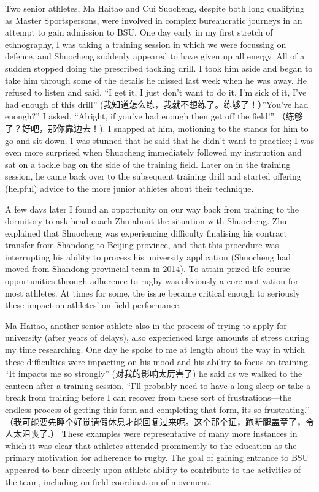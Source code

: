\begin{CJK}{UTF8}{gbsn}
Two senior athletes, Ma Haitao and Cui Suocheng, despite both long qualifying as Master Sportspersons, were involved in complex bureaucratic journeys in an attempt to gain admission to BSU.  One day early in my first stretch of ethnography, I was taking a training session in which we were focussing on defence, and Shuocheng suddenly appeared to have given up all energy.  All of a sudden stopped doing the prescribed tackling drill.  I took him aside and began to take him through some of the details he missed last week when he was away.  He refused to listen and said, ``I get it, I just don't want to do it, I'm sick of it, I've had enough of this drill'' (我知道怎么练，我就不想练了。练够了！）''You've had enough?'' I asked, ``Alright, if you've had enough then get off the field!'' （练够了？好吧，那你靠边去！).  I snapped at him, motioning to the stands for him to go and sit down. I was stunned that he said that he didn't want to practice; I was even more surprised when Shuocheng immediately followed my instruction and sat on a tackle bag on the side of the training field.  Later on in the training session, he came back over to the subsequent training drill and started offering (helpful) advice to the more junior athletes about their technique.

A few days later I found an opportunity on our way back from training to the dormitory to ask head coach Zhu about the situation with Shuocheng.  Zhu explained that Shuocheng was experiencing difficulty finalising his contract transfer from Shandong to Beijing province, and that this procedure was interrupting his ability to process his university application (Shuocheng had moved from Shandong provincial team in 2014). To attain prized life-course opportunities through adherence to rugby was obviously a core motivation for most athletes. At times for some, the issue became critical enough to seriously these impact on athletes' on-field performance.

Ma Haitao, another senior athlete also in the process of trying to apply for university (after years of delays), also experienced large amounts of stress during my time researching.  One day he spoke to me at length about the way in which these difficulties were impacting on his mood and his ability to focus on training. ``It impacts me so strongly'' (对我的影响太厉害了) he said as we walked to the canteen after a training session. ``I'll probably need to have a long sleep or take a break from training before I can recover from these sort of frustrations---the endless process of getting this form and completing that form, its so frustrating.'' （我可能要先睡个好觉请假休息才能回复过来呢。这个那个证，跑断腿盖章了，令人太沮丧了.）  These examples were representative of many more instances in which it was clear that athletes attended prominently to the education as the primary motivation for adherence to rugby.  The goal of gaining entrance to BSU appeared to bear directly upon athlete ability to contribute to the activities of the team, including on-field coordination of movement.


\end{CJK}
